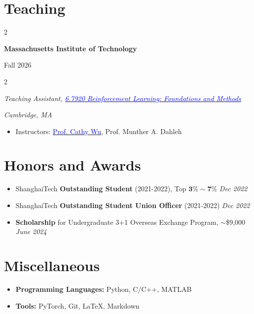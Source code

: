 \documentclass[10pt, letterpaper]{article}
\newenvironment{highlights}{
    \begin{itemize}[
        topsep=0.10 cm,
        parsep=0.10 cm,
        partopsep=0pt,
        itemsep=0pt,
        leftmargin=0 cm + 10pt
    ]
}{
    \end{itemize}
} %
\newenvironment{twocolentry}[2][]{
    \onecolentry
    \def\secondColumn{#2}
    \setcolumnwidth{\fill, 4.5 cm}
    \begin{paracol}{2}
}{
    \switchcolumn \raggedleft \secondColumn
    \end{paracol}
    \endonecolentry
} %
\begin{document}
    \section{Teaching}
    \begin{twocolentry}{
        Fall 2026
    }
        \textbf{Massachusetts Institute of Technology}
    \end{twocolentry}
    \begin{twocolentry}{
        \textit{Cambridge, MA}
    }
        \textit{Teaching Assistant, \href{https://web.mit.edu/6.7920/www/index.html}{\textcolor{blue}{6.7920 Reinforcement Learning: Foundations and Methods}}}
    \end{twocolentry}
    \begin{highlights}
        \item Instructors: \href{https://www.wucathy.com/}{\textcolor{blue}{Prof. Cathy Wu}}, Prof. Munther A. Dahleh
    \end{highlights}
    
    \section{Honors and Awards}
    \begin{highlights}
\item ShanghaiTech \textbf{Outstanding Student} (2021-2022), Top $\mathbf{3\%\sim7\%}$ \hfill \textit{Dec 2022}
\item ShanghaiTech \textbf{Outstanding Student Union Officer} (2021-2022) \hfill \textit{Dec 2022}
\item \textbf{Scholarship} for Undergraduate 3+1 Overseas Exchange Program, $\sim$\$9,000 \hfill \textit{June 2024}
    \end{highlights}
    \section{Miscellaneous}
        \begin{highlights}
            \item \textbf{Programming Languages:} Python, C/C++, MATLAB
            \item \textbf{Tools:} PyTorch, Git, LaTeX, Markdown
        \end{highlights}
        
\end{document}
